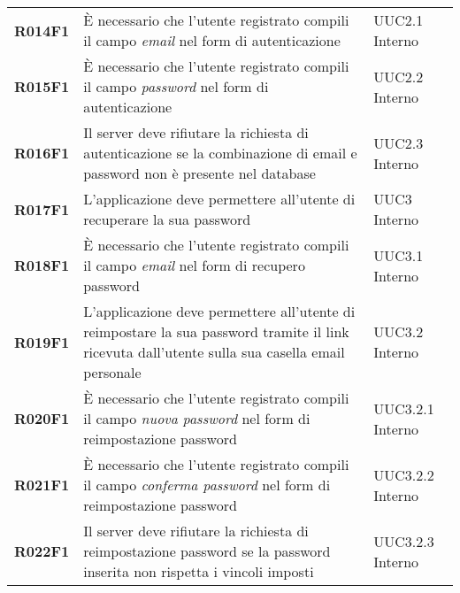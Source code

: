 \documentclass[../analisi-dei-requisiti.tex]{subfiles}
\begin{document}
\begin{longtable}[H]{>{\centering\bfseries}m{3cm} >{\centering}m{10cm} >{\centering\arraybackslash}m{3cm}}
  R014F1                               & È necessario che l'utente registrato compili il campo \textit{email} nel form di autenticazione                                                                                                         & UUC2.1 Interno                \\
  R015F1                               & È necessario che l'utente registrato compili il campo \textit{password} nel form di autenticazione                                                                                                      & UUC2.2 Interno                \\
  R016F1                               & Il server deve rifiutare la richiesta di autenticazione se la combinazione di email e password non è presente nel database                                                                              & UUC2.3 Interno                \\
  R017F1                               & L'applicazione deve permettere all'utente di recuperare la sua password                                                                                                                                 & UUC3 Interno                  \\
  R018F1                               & È necessario che l'utente registrato compili il campo \textit{email} nel form di recupero password                                                                                                      & UUC3.1 Interno                \\
  R019F1                               & L'applicazione deve permettere all'utente di reimpostare la sua password tramite il link ricevuta dall'utente sulla sua casella email personale                                                         & UUC3.2 Interno                \\
  R020F1                               & È necessario che l'utente registrato compili il campo \textit{nuova password} nel form di reimpostazione password                                                                                       & UUC3.2.1 Interno              \\
  R021F1                               & È necessario che l'utente registrato compili il campo \textit{conferma password} nel form di reimpostazione password                                                                                    & UUC3.2.2 Interno              \\
  R022F1                               & Il server deve rifiutare la richiesta di reimpostazione password se la password inserita non rispetta i vincoli imposti                                                                                 & UUC3.2.3 Interno              \\

\end{longtable}
\end{document}
